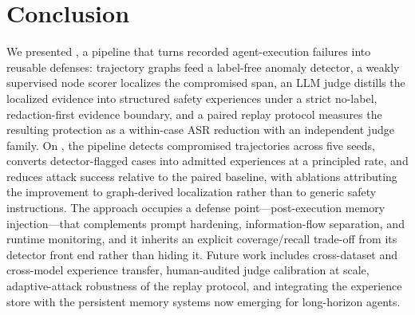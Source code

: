 \section{Conclusion}
\label{sec:conclusion}

We presented \method{}, a pipeline that turns recorded agent-execution failures into reusable defenses: trajectory graphs feed a label-free anomaly detector, a weakly supervised node scorer localizes the compromised span, an LLM judge distills the localized evidence into structured safety experiences under a strict no-label, redaction-first evidence boundary, and a paired replay protocol measures the resulting protection as a within-case ASR reduction with an independent judge family. On \tool{}, the pipeline detects compromised trajectories across five seeds, converts detector-flagged cases into admitted experiences at a principled rate, and reduces attack success relative to the paired baseline, with ablations attributing the improvement to graph-derived localization rather than to generic safety instructions. The approach occupies a defense point---post-execution memory injection---that complements prompt hardening, information-flow separation, and runtime monitoring, and it inherits an explicit coverage/recall trade-off from its detector front end rather than hiding it. Future work includes cross-dataset and cross-model experience transfer, human-audited judge calibration at scale, adaptive-attack robustness of the replay protocol, and integrating the experience store with the persistent memory systems now emerging for long-horizon agents.
